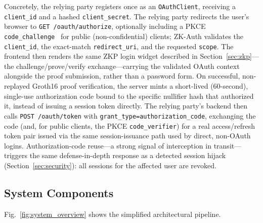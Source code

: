 \documentclass[journal,twoside,10pt]{IEEEtran}
\begin{document}
Concretely, the relying party registers once as an \texttt{OAuthClient},
receiving a \texttt{client\_id} and a hashed \texttt{client\_secret}.
The relying party redirects the user's browser to
\texttt{GET /oauth/authorize}, optionally including a PKCE
\texttt{code\_challenge}~\cite{rfc7636} for public (non-confidential)
clients; ZK-Auth validates the \texttt{client\_id}, the exact-match
\texttt{redirect\_uri}, and the requested \texttt{scope}. The frontend
then renders the same ZKP login widget described in
Section~\ref{sec:zkp}---the challenge/prove/verify exchange---carrying
the validated OAuth context alongside the proof submission, rather than
a password form. On successful, non-replayed Groth16 proof verification,
the server mints a short-lived (60-second), single-use authorization
code bound to the specific nullifier hash that authorized it, instead of
issuing a session token directly. The relying party's backend then
calls \texttt{POST /oauth/token} with
\texttt{grant\_type=authorization\_code}, exchanging the code (and, for
public clients, the PKCE \texttt{code\_verifier}) for a real
access/refresh token pair issued via the same session-issuance path used
by direct, non-OAuth logins. Authorization-code reuse---a strong signal
of interception in transit---triggers the same defense-in-depth response
as a detected session hijack (Section~\ref{sec:security}): all sessions
for the affected user are revoked.

\subsection{System Components}

Fig.~\ref{fig:system_overview} shows the simplified architectural pipeline.
\end{document}
